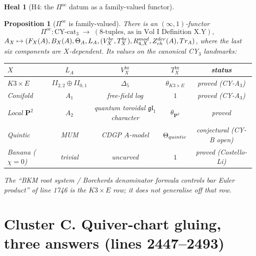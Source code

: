 \documentclass[11pt]{amsart}
\newtheorem{proposition}[theorem]{Proposition}
\theoremstyle{definition}
\newtheorem{heal}[attack]{Heal}
\providecommand{\cF}{\mathcal{F}}
\providecommand{\cZ}{\mathcal{Z}}
\providecommand{\fgl}{\mathfrak{gl}}
\providecommand{\bP}{\mathbf{P}}
\begin{document}
\begin{heal}[H4: the $\Pi^{\mathrm{oc}}$ datum as a family-valued functor]\leavevmode

\begin{proposition}[$\Pi^{\mathrm{oc}}$ is family-valued]\label{prop:pi-oc-family}
There is an $(\infty,1)$-functor
\[
 \Pi^{\mathrm{oc}} \colon \mathrm{CY}\text{-}\mathrm{cat}_3
 \;\longrightarrow\;
 (\text{8-tuples, as in Vol~I Definition~X.Y}),
\]
$A_X \mapsto (\cF_X(A), \overline{B}_X(A), \Theta_A, L_A,
(V^{\mathrm{br}}_X, T^{\mathrm{br}}_X), R^{\mathrm{mod}}_{4,X},
\cZ^{\mathrm{der}}_{\mathrm{ch}}(A), \Tr_A)$,
where the last six components are {\em $X$-dependent}. Its values on
the canonical CY$_3$ landmarks:

\begin{center}
\renewcommand{\arraystretch}{1.2}
\small
\begin{tabular}{lcccc}
 \toprule
 $X$ & $L_A$ & $V^{\mathrm{br}}_X$ & $T^{\mathrm{br}}_X$ & status \\
 \midrule
 $K3 \times E$ & $II_{2,2} \oplus II_{0,1}$ & $\Delta_5$ & $\theta_{K3 \times E}$ & proved ({\em CY-A}$_{3}$) \\
 Conifold & $A_1$ & free-field log & $1$ & proved ({\em CY-A}$_{3}$) \\
 Local $\bP^2$ & $A_2$ & quantum toroidal $\fgl_1$ character & $\theta_{\bP^2}$ & proved \\
 Quintic & MUM & CDGP $A$-model & $\Theta_{\rm quintic}$ & conjectural (CY-B open) \\
 Banana ($\chi=0$) & trivial & uncurved & $1$ & proved (Costello-Li) \\
 \bottomrule
\end{tabular}
\end{center}
\noindent The ``BKM root system / Borcherds denominator formula
controls bar Euler product'' of line 1746 is the $K3 \times E$ row;
it does not generalise off that row.
\end{proposition}
\end{heal}

\section{Cluster C. Quiver-chart gluing, three answers (lines 2447--2493)}
\end{document}

